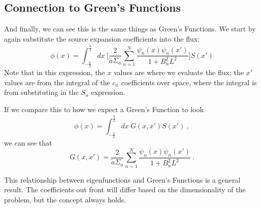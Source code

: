 \documentclass[12pt]{article}
\begin{document}
\subsection*{Connection to Green's Functions}
And finally, we can see this is the same things as Green's Functions. We start by again substitute the source expansion coefficients into the flux:
\[
\phi(x) = \int_{-\frac{\tilde{a}}{2}}^{\frac{\tilde{a}}{2}} dx\: \biggl[\frac{2}{\tilde{a} \Sigma_a} \sum_{n=1}^N \frac{\psi_n(x) \psi_n(x')}{1 + B_n^2  L^2}  \biggr] S(x')
\]
Note that in this expression, the $x$ values are where we evaluate the flux; the $x'$ values are from the integral of the $c_n$ coefficients over space, where the integral is from substituting in the $S_n$ expression.

If we compare this to how we expect a Green's Function to look
\[
\phi(x) = \int_{-\frac{\tilde{a}}{2}}^{\frac{\tilde{a}}{2}} dx\: G(x,x') S(x')\:,
\]
we can see that
\[
G(x,x') = \frac{2}{\tilde{a} \Sigma_a} \sum_{n=1}^N \frac{\psi_n(x) \psi_n(x')}{1 + B_n^2  L^2}\:.
\]

This relationship between eigenfunctions and Green's Functions is a general result. The coefficients out front will differ based on the dimensionality of the problem, but the concept always holds.
\end{document}

